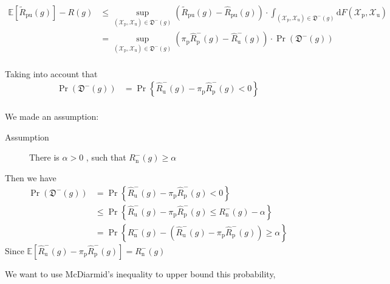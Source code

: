 \documentclass[12pt]{article}
\theoremstyle{definition}
\begin{document}
 $$
 \begin{aligned}
 \mathbb{E}\left[\widetilde{R}_{\mathrm{pu}}(g)\right]-R(g) & \leq \sup _{\left(\mathcal{X}_{\mathrm{p}}, \mathcal{X}_{\mathrm{u}}\right) \in \mathfrak{D}^{-}(g)}\left(\widetilde{R}_{\mathrm{pu}}(g)-\widehat{R}_{\mathrm{pu}}(g)\right) \cdot \int_{\left(\mathcal{X}_{\mathrm{p}}, \mathcal{X}_{\mathrm{u}}\right) \in \mathfrak{D}^{-}(g)} \mathrm{d} F\left(\mathcal{X}_{\mathrm{p}}, \mathcal{X}_{\mathrm{u}}\right) \\
 &=\sup _{\left(\mathcal{X}_{\mathrm{p}}, \mathcal{X}_{\mathrm{u}}\right) \in \mathfrak{D}^{-}(g)}\left(\pi_{\mathrm{p}} \widehat{R}_{\mathrm{p}}^{-}(g)-\widehat{R}_{\mathrm{u}}^{-}(g)\right) \cdot \operatorname{Pr}\left(\mathfrak{D}^{-}(g)\right) \\
 \end{aligned}
 $$
 
 Taking into account that 
 $$
 \begin{aligned}
 \operatorname{Pr}\left(\mathfrak{D}^{-}(g)\right) &=\operatorname{Pr}\left\{\widehat{R}_{\mathrm{u}}^{-}(g)-\pi_{\mathrm{p}} \widehat{R}_{\mathrm{p}}^{-}(g)<0\right\} \\
 \end{aligned}
 $$
 
  We made an assumption:
  \begin{description}
  	\item[Assumption] There is $\alpha>0$ , such that $R_{\mathrm{n}}^{-}(g)\ge \alpha $
  \end{description}

 Then we have 
 $$
 \begin{aligned}
 \operatorname{Pr}\left(\mathfrak{D}^{-}(g)\right) &=\operatorname{Pr}\left\{\widehat{R}_{\mathrm{u}}^{-}(g)-\pi_{\mathrm{p}} \widehat{R}_{\mathrm{p}}^{-}(g)<0\right\} \\
 & \leq \operatorname{Pr}\left\{\widehat{R}_{\mathrm{u}}^{-}(g)-\pi_{\mathrm{p}} \widehat{R}_{\mathrm{p}}^{-}(g) \leq R_{\mathrm{n}}^{-}(g)-\alpha\right\} \\
 &=\operatorname{Pr}\left\{R_{\mathrm{n}}^{-}(g)-\left(\widehat{R}_{\mathrm{u}}^{-}(g)-\pi_{\mathrm{p}} \widehat{R}_{\mathrm{p}}^{-}(g)\right) \geq \alpha\right\}
 \end{aligned}
 $$
 Since 
 $\mathbb{E}\left[\widehat{R}_{\mathrm{u}}^{-}(g)-\pi_{\mathrm{p}} \widehat{R}_{\mathrm{p}}^{-}(g)\right]= R_{\mathrm{n}}^{-}(g)$
 
 We want to use McDiarmid's inequality to upper bound this probability,
 
\end{document}
